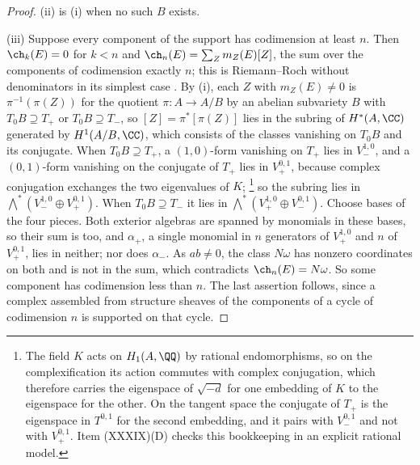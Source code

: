 \begin{proof}
(ii) is (i) when no such $B$ exists.

(iii) Suppose every component of the support has codimension at least $n$.
Then $\ch_{k}(E)=0$ for $k<n$ and $\ch_{n}(E)=\sum_{Z}m_{Z}(E)[Z]$, the sum
over the components of codimension exactly $n$; this is Riemann--Roch without
denominators in its simplest case \cite[Chapter~15]{Ful98}. By (i), each $Z$
with $m_{Z}(E)\ne0$ is $\pi^{-1}(\pi(Z))$ for the quotient $\pi\colon A\to A/B$
by an abelian subvariety $B$ with $T_{0}B\supseteq T_{+}$ or
$T_{0}B\supseteq T_{-}$, so $[Z]=\pi^{*}[\pi(Z)]$ lies in the subring of
$H^{*}(A,\CC)$ generated by $H^{1}(A/B,\CC)$, which consists of the classes
vanishing on $T_{0}B$ and its conjugate. When $T_{0}B\supseteq T_{+}$, a
$(1,0)$-form vanishing on $T_{+}$ lies in $V_{-}^{1,0}$, and a $(0,1)$-form
vanishing on the conjugate of $T_{+}$ lies in $V_{+}^{0,1}$, because complex
conjugation exchanges the two eigenvalues of $K$;%
\footnote{The field $K$ acts on $H_{1}(A,\QQ)$ by rational endomorphisms, so
on the complexification its action commutes with complex conjugation, which
therefore carries the eigenspace of $\sqrt{-d}$ for one embedding of $K$ to
the eigenspace for the other. On the tangent space the conjugate of $T_{+}$ is
the eigenspace in $T^{0,1}$ for the second embedding, and it pairs with
$V_{-}^{0,1}$ and not with $V_{+}^{0,1}$. Item (XXXIX)(D) checks this
bookkeeping in an explicit rational model.}
so the subring lies in $\bigwedge^{*}(V_{-}^{1,0}\oplus V_{+}^{0,1})$. When
$T_{0}B\supseteq T_{-}$ it lies in $\bigwedge^{*}(V_{+}^{1,0}\oplus
V_{-}^{0,1})$. Choose bases of the four pieces. Both exterior algebras are
spanned by monomials in these bases, so their sum is too, and $\alpha_{+}$,
a single monomial in $n$ generators of $V_{+}^{1,0}$ and $n$ of $V_{+}^{0,1}$,
lies in neither; nor does $\alpha_{-}$. As $ab\ne0$, the class $N\omega$ has
nonzero coordinates on both and is not in the sum, which contradicts
$\ch_{n}(E)=N\omega$. So some component has codimension less than $n$. The
last assertion follows, since a complex assembled from structure sheaves of
the components of a cycle of codimension $n$ is supported on that cycle.
\end{proof}

